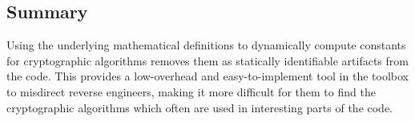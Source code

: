 \documentclass[twocolumn]{article}
\begin{document}
\vspace*{-0.5\baselineskip}
\subsection*{Summary}

Using the underlying mathematical definitions to dynamically compute constants for cryptographic algorithms removes them as statically identifiable artifacts from the code. This provides a low-overhead and easy-to-implement tool in the toolbox to misdirect reverse engineers, making it more difficult for them to find the cryptographic algorithms which often are used in interesting parts of the code.

\end{document}
